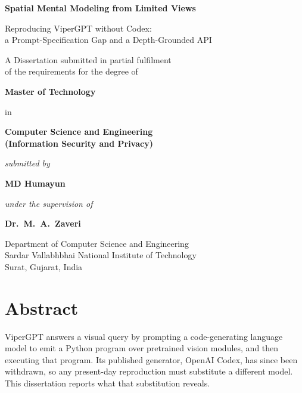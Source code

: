 \documentclass[12pt,a4paper,oneside]{report}
\begin{document}
\begin{titlepage}
\centering
\vspace*{1.2cm}
{\LARGE\bfseries Spatial Mental Modeling from Limited Views\par}
\vspace{0.8cm}
{\Large Reproducing ViperGPT without Codex:\\[3pt]
a Prompt-Specification Gap and a Depth-Grounded API\par}
\vspace{2.0cm}
{\large A Dissertation submitted in partial fulfilment\\
of the requirements for the degree of\par}
\vspace{0.5cm}
{\large\bfseries Master of Technology\par}
{\large in\par}
{\large\bfseries Computer Science and Engineering\\
(Information Security and Privacy)\par}
\vspace{1.8cm}
{\large\itshape submitted by\par}
\vspace{0.25cm}
{\Large\bfseries MD Humayun\par}
\vspace{1.4cm}
{\large\itshape under the supervision of\par}
\vspace{0.25cm}
{\Large\bfseries Dr.\ M.\ A.\ Zaveri\par}
\vfill
{\large Department of Computer Science and Engineering\\
Sardar Vallabhbhai National Institute of Technology\\
Surat, Gujarat, India\par}
\vspace{0.6cm}
{\large \the\year\par}
\end{titlepage}

\setcounter{page}{2}

\chapter*{Abstract}

ViperGPT answers a visual query by prompting a code-generating language model to emit
a Python program over pretrained vision modules, and then executing that program. Its
published generator, OpenAI Codex, has since been withdrawn, so any present-day
reproduction must substitute a different model. This dissertation reports what that
substitution reveals.
\end{document}
